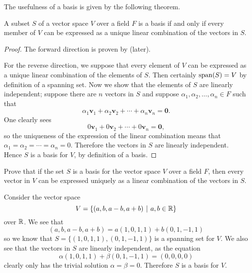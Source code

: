The usefulness of a basis is given by the following theorem.

\begin{theorem}\label{thrm-basis-iff-has-unique-linear-combinatio}
    A subset $S$ of a vector space $V$ over a field $F$ is a basis if and only if every member of $V$ can be expressed as a unique linear combination of the vectors in $S$.
\end{theorem}
\begin{proof}
    The forward direction is proven by  (later).

    For the reverse direction, we suppose that every element of $V$ can be expressed as a unique linear combination of the elements of $S$. Then certainly $\mathrm{span}(S) = V$ by definition of a spanning set. Now we show that the elements of $S$ are linearly independent; suppose there are $n$ vectors in $S$ and suppose $\alpha_1, \alpha_2, \dots, \alpha_n \in F$ such that
    \[
        \alpha_1\textbf{v}_1 + \alpha_2\textbf{v}_2 + \cdots + \alpha_n\textbf{v}_n = \textbf{0}.
    \]
    One clearly sees
    \[
        0\textbf{v}_1 + 0\textbf{v}_2 + \cdots + 0\textbf{v}_n = \textbf{0},
    \]
    so the uniqueness of the expression of the linear combination means that $\alpha_1 = \alpha_2 = \cdots = \alpha_n = 0$. Therefore the vectors in $S$ are linearly independent. Hence $S$ is a basis for $V$, by definition of a basis.
\end{proof}

\begin{exercise}\label{exercise-basis-means-unique-linear-combination}
    Prove that if the set $S$ is a basis for the vector space $V$ over a field $F$, then every vector in $V$ can be expressed uniquely as a linear combination of the vectors in $S$.
\end{exercise}

\begin{example}
    Consider the vector space
    \[
        V = \{(a, b, a-b, a+b) \vert a, b \in \R\}
    \]
    over $\mathbb{R}$. We see that
    \[
        (a, b, a-b, a+b) = a(1, 0, 1, 1) + b(0, 1, -1, 1)
    \]
    so we know that $S = \{(1, 0, 1, 1), (0, 1, -1, 1)\}$ is a spanning set for $V$. We also see that the vectors in $S$ are linearly independent, as the equation
    \[
        \alpha(1, 0, 1, 1) + \beta(0, 1, -1, 1) = (0, 0, 0, 0)
    \]
    clearly only has the trivial solution $\alpha = \beta = 0$. Therefore $S$ is a basis for $V$.
\end{example}

